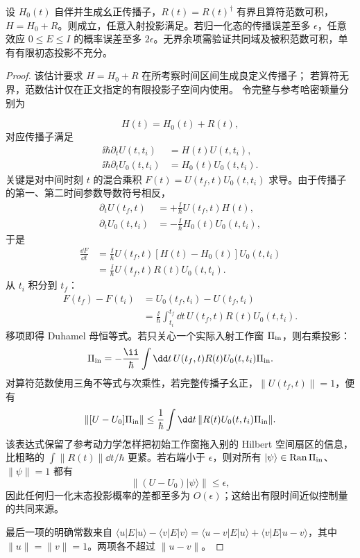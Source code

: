 \begin{theorem}
设 $H_0(t)$ 自伴并生成幺正传播子，$R(t)=R(t)^\dagger$ 有界且算符范数可积，$H=H_0+R$。则成立，任意入射投影满足。若归一化态的传播误差至多 $\epsilon$，任意效应 $0\le E\le I$ 的概率误差至多 $2\epsilon$。无界余项需验证共同域及被积范数可积，单有有限初态投影不充分。
\end{theorem}
\begin{proof}
该估计要求 $H=H_0+R$ 在所考察时间区间生成良定义传播子； 若算符无界，范数估计仅在正文指定的有限投影子空间内使用。 令完整与参考哈密顿量分别为

\begin{equation*}
H(t)=H_0(t)+R(t),
\end{equation*}
对应传播子满足
\begin{align*}
\ii\hbar\partial_tU(t,t_i)&=H(t)U(t,t_i),\\
\ii\hbar\partial_tU_0(t,t_i)&=H_0(t)U_0(t,t_i).
\end{align*}
关键是对中间时刻 $t$ 的混合乘积
$F(t)=U(t_f,t)U_0(t,t_i)$ 求导。由于传播子的第一、第二时间参数导数符号相反，
\begin{align*}
\partial_tU(t_f,t)&=+\frac{\ii}{\hbar}U(t_f,t)H(t),\\
\partial_tU_0(t,t_i)&=-\frac{\ii}{\hbar}H_0(t)U_0(t,t_i),
\end{align*}
于是
\begin{align*}
\frac{\dd F}{\dd t}
&=\frac{\ii}{\hbar}U(t_f,t)
[H(t)-H_0(t)]U_0(t,t_i)\\
&=\frac{\ii}{\hbar}U(t_f,t)R(t)U_0(t,t_i).
\end{align*}
从 $t_i$ 积分到 $t_f$：
\begin{align*}
F(t_f)-F(t_i)
&=U_0(t_f,t_i)-U(t_f,t_i)\\
&=\frac{\ii}{\hbar}
\int_{t_i}^{t_f}\dd t\,
U(t_f,t)R(t)U_0(t,t_i).
\end{align*}
移项即得 Duhamel 母恒等式。若只关心一个实际入射工作窗 $\Pi_{\rm in}$，则右乘投影：
\begin{equation*}
[U-U_0]\Pi_{\rm in}
=-\frac{\ii}{\hbar}
\int\dd t\,U(t_f,t)R(t)U_0(t,t_i)\Pi_{\rm in}.
\end{equation*}
对算符范数使用三角不等式与次乘性，若完整传播子幺正，$\|U(t_f,t)\|=1$，便有
\begin{equation*}
\|[U-U_0]\Pi_{\rm in}\|
\le\frac1\hbar\int\dd t\,
\|R(t)U_0(t,t_i)\Pi_{\rm in}\|.
\end{equation*}
该表达式保留了参考动力学怎样把初始工作窗拖入别的 Hilbert 空间扇区的信息，比粗略的
$\int\|R(t)\|\dd t/\hbar$ 更紧。若右端小于 $\epsilon$，则对所有
$|\psi\rangle\in\operatorname{Ran}\Pi_{\rm in}$、$\|\psi\|=1$ 都有
\begin{equation*}
\|(U-U_0)|\psi\rangle\|\le\epsilon,
\end{equation*}
因此任何归一化末态投影概率的差都至多为 $O(\epsilon)$；这给出有限时间近似控制量的共同来源。

最后一项的明确常数来自 $\langle u|E|u\rangle-\langle v|E|v\rangle=\langle u-v|E|u\rangle+\langle v|E|u-v\rangle$，其中 $\|u\|=\|v\|=1$。两项各不超过 $\|u-v\|$。
\end{proof}


